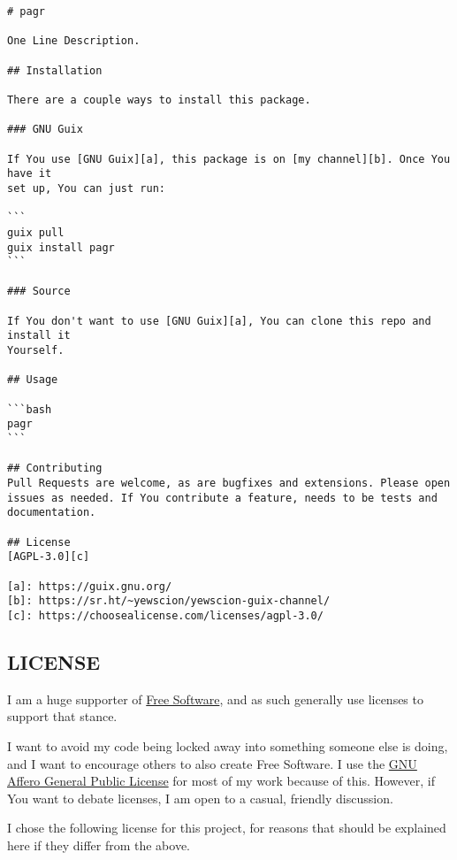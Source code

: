 \documentclass[11pt]{article}
\begin{document}
\begin{verbatim}
# pagr

One Line Description.

## Installation

There are a couple ways to install this package.

### GNU Guix

If You use [GNU Guix][a], this package is on [my channel][b]. Once You have it
set up, You can just run:

```
guix pull
guix install pagr
```

### Source

If You don't want to use [GNU Guix][a], You can clone this repo and install it
Yourself.

## Usage

```bash
pagr
```

## Contributing
Pull Requests are welcome, as are bugfixes and extensions. Please open
issues as needed. If You contribute a feature, needs to be tests and
documentation.

## License
[AGPL-3.0][c]

[a]: https://guix.gnu.org/
[b]: https://sr.ht/~yewscion/yewscion-guix-channel/
[c]: https://choosealicense.com/licenses/agpl-3.0/
\end{verbatim}

\subsection{LICENSE}
\label{sec:org06b7db8}
I am a huge supporter of \href{https://en.wikipedia.org/wiki/Free\_software}{Free Software}, and as such generally use licenses to
support that stance.

I want to avoid my code being locked away into something someone else is doing,
and I want to encourage others to also create Free Software. I use the \href{https://www.gnu.org/licenses/agpl-3.0.en.html}{GNU
Affero General Public License} for most of my work because of this. However, if
You want to debate licenses, I am open to a casual, friendly discussion.

I chose the following license for this project, for reasons that should be
explained here if they differ from the above.
\end{document}
